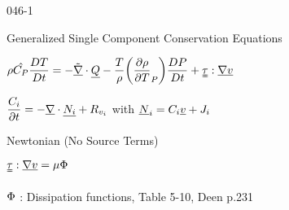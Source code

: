 \begin{mitframe}{046-1}

\begin{listone}
\item Generalized Single Component Conservation Equations

\item $\dens\hat{\cp}\dfrac{\elecdisplace\Temp}{\elecdisplace{t}}=-\tilde{\gradop}\cdot\uline{\heatflow}-\dfrac{\Temp}{\dens}\bigg(\dfrac{\partial\dens}{\partial\Temp}_{\p}\bigg)\dfrac{\elecdisplace\p}{\elecdisplace{t}}+\uuline{\torque}:\gradop\uline{\vvel}$
\item $\dfrac{\conc_{\state}}{\partial{t}}=-\gradop\cdot\uline{\nummoles_{\state}}+\gasconst_{\vvel_{\state}}$ with $\uline{\nummoles}_{\state}=\conc_{\state}\uline{\vvel}+\molspecflux$

				\begin{listtwo}
                			\item Newtonian (No Source Terms)
                            \begin{listthree}
                            			\item $\uuline{\torque}:\gradop\uline{\vvel}=\chempot\pot$
                                        
                                        \begin{listfour}
                                        		\item $\pot$ : Dissipation functions, Table 5-10, Deen p.231
                                        \end{listfour}
                            

\end{listthree}
\end{listtwo}
\end{listone}
\end{mitframe}
